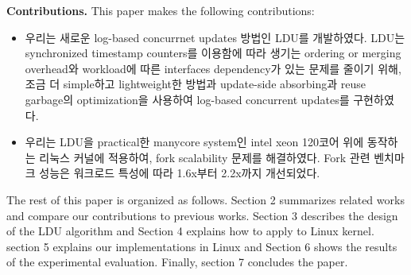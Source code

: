 \else

\fi




\ifkor
\noindent
\textbf{Contributions.} This paper makes the following contributions:
\begin{itemize}
\item 우리는 새로운 log-based concurrnet updates 방법인 LDU를 개발하였다. 
LDU는 synchronized timestamp counters를 이용함에 따라 생기는 ordering or merging overhead와
workload에 따른 interfaces dependency가 있는 문제를 줄이기 위해, 조금 더 simple하고
lightweight한 방법과 update-side absorbing과 reuse garbage의 optimization을
사용하여 log-based concurrent updates를 구현하였다.
\item 우리는 LDU을 practical한 manycore system인 intel xeon 120코어 위에 동작하는 리눅스 커널에
적용하여, fork scalability 문제를 해결하였다. 
Fork 관련 벤치마크 성능은 워크로드 특성에 따라 1.6x부터 2.2x까지 개선되었다.
\end{itemize}
\else

\fi





The rest of this paper is organized as follows.
Section 2 summarizes related works and compare our contributions to previous
works. 
Section 3 describes the design of the LDU algorithm and 
Section 4 explains how to apply to Linux kernel.
section 5 explains our implementations in Linux and
Section 6 shows the results of the experimental evaluation. 
Finally, section 7 concludes the paper.

%
%






